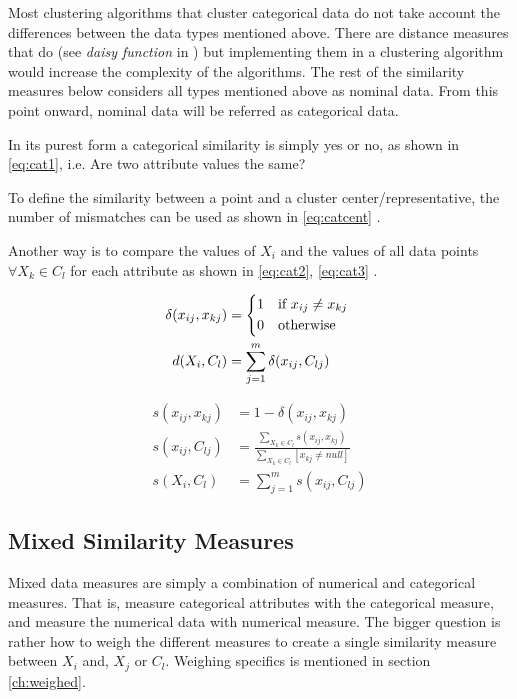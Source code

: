 \documentclass[../report.tex]{subfiles}
\begin{document}
Most clustering algorithms that cluster categorical data do not take account the differences between the data types mentioned above. There are distance measures that do (see \textit{daisy function} in \cite{Kaufman1990}) but implementing them in a clustering algorithm would increase the complexity of the algorithms. The rest of the similarity measures below considers all types mentioned above as nominal data. From this point onward, nominal data will be referred as categorical data.

In its purest form a categorical similarity is simply yes or no, as shown in \ref{eq:cat1}, i.e. Are two attribute values the same? \cite{Guha2000, Kaufman1990}

To define the similarity between a point and a cluster center/representative, the number of mismatches can be used as shown in \ref{eq:catcent} \cite{Huang97clusteringlarge}.

Another way is to compare the values of $X_i$ and the values of all data points $\forall X_k \in C_l$ for each attribute as shown in \ref{eq:cat2}, \ref{eq:cat3} \cite{Guha2000, Cheung2013}.


\begin{align}
\label{eq:cat1}
\delta{(x_{ij},x_{kj})} &= 
  \begin{cases*}
  1 & if $x_{ij} \neq x_{kj}$ \\
    0 & otherwise
  \end{cases*} \\
\label{eq:catcent}
d(X_{i},C_l) &= \sum^{m}_{j=1}\delta(x_{ij},C_{lj})
\end{align}

\begin{align}
s(x_{ij},x_{kj}) &= 1 - \delta{(x_{ij},x_{kj})} \\
\label{eq:cat2}
s(x_{ij},C_{lj}) &= \frac{\sum_{X_k \in C_{l}}{s(x_{ij},x_{kj})}}{\sum_{X_k \in C_{l} }{[ x_{kj} \neq null ]}} \\
\label{eq:cat3}
s(X_{i},C_{l}) &= \sum_{j = 1}^{m}{s(x_{ij},C_{lj})}
\end{align}

\subsection{Mixed Similarity Measures} \label{sssec:mixed-sim}
Mixed data measures are simply a combination of numerical and categorical measures. That is, measure categorical attributes with the categorical measure, and measure the numerical data with numerical measure. The bigger question is rather how to weigh the different measures to create a single similarity measure between $X_i$ and, $X_j$ or $C_l$. Weighing specifics is mentioned in section \ref{ch:weighed}.
\end{document}
